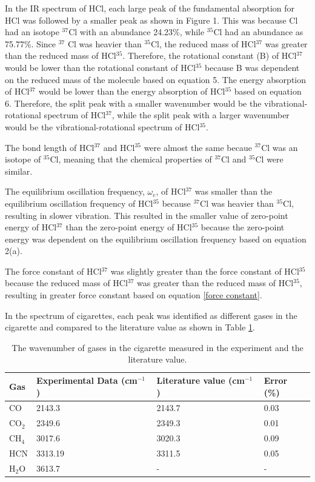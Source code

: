 \documentclass[twocolumn]{article} %
\begin{document}
In the IR spectrum of HCl, each large peak of the fundamental absorption for HCl was followed by a smaller peak as shown in Figure 1. This was because Cl had an isotope $^{37}$Cl with an abundance 24.23\%, while $^{35}$Cl had an abundance as 75.77\%. Since $^{37}$ Cl was heavier than $^{35}$Cl, the reduced mass of HCl$^{37}$ was greater than the reduced mass of HCl$^{35}$. Therefore, the rotational constant (B) of HCl$^{37}$ would be lower than the rotational constant of HCl$^{35}$ because B was dependent on the reduced mass of the molecule based on equation 5. The energy absorption of HCl$^{37}$ would be lower than the energy absorption of HCl$^{35}$ based on equation 6. Therefore, the split peak with a smaller wavenumber would be the vibrational-rotational spectrum of HCl$^{37}$, while the split peak with a larger wavenumber would be the vibrational-rotational spectrum of HCl$^{35}$. 


The bond length of HCl$^{37}$ and HCl$^{35}$ were almost the same becaue $^{37}$Cl was an isotope of $^{35}$Cl, meaning that the chemical properties of $^{37}$Cl and $^{35}$Cl were similar. 

The equilibrium oscillation frequency, $\omega_e$, of HCl$^{37}$ was smaller than the equilibrium oscillation frequency of HCl$^{35}$ because $^{37}$Cl was heavier than $^{35}$Cl, resulting in slower vibration. 
This resulted in the smaller value of zero-point energy of HCl$^{37}$ than the zero-point energy of HCl$^{35}$ because the zero-point energy was dependent on the equilibrium oscillation frequency based on equation 2(a). 

The force constant of HCl$^{37}$ was slightly greater than the force constant of HCl$^{35}$ because the reduced mass of HCl$^{37}$ was greater than the reduced mass of HCl$^{35}$, resulting in greater force constant based on equation \ref{force constant}.

In the spectrum of cigarettes, each peak was identified as different gases in the cigarette and compared to the literature value as shown in Table \ref{cigarette}.

\begin{table}[h]
    \caption{The wavenumber of gases in the cigarette measured in the experiment and the literature value.}
    \begin{tabular}{L{.7in}C{.7in}C{.7in}C{.7in}}\toprule
        Gas & Experimental Data (cm$^{-1}$)      & Literature value (cm$^{-1}$)  & Error (\%) \\\midrule
        CO  & 2143.3 & 2143.7\cite{Cigarette} & 0.03 \\
        CO$_2$  & 2349.6 & 2349.3\cite{Cigarette} & 0.01 \\
        CH$_4$  &3017.6 &  3020.3\cite{Cigarette} & 0.09 \\
        HCN  & 3313.19 & 3311.5\cite{Cigarette} & 0.05 \\
        H$_2$O  & 3613.7 & - & - \\\bottomrule
    \end{tabular}
    \label{cigarette}
\end{table}
\end{document}
